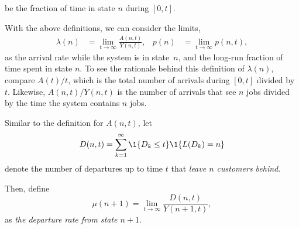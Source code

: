 be the fraction of time in state $n$ during $[0,t]$. 





With the above definitions, we can consider the limits,
\begin{align}\label{eq:p(n)}
 \lambda(n) &= \lim_{t\to\infty} \frac{A(n,t)}{Y(n,t)}, &p(n) &=\lim_{t\to\infty} p(n,t),
\end{align}
as the arrival rate while the system is in state~$n$, and the long-run fraction of time spent in state $n$.
To see the rationale behind this definition of $\lambda(n)$, compare $A(t)/t$, which is the total number of arrivals during $[0,t]$ divided by~$t$.
Likewise, $A(n,t)/Y(n,t)$ is the number of arrivals that see $n$ jobs divided by the time the system contains $n$ jobs.



Similar to the definition for $A(n,t)$, let 
\begin{equation}\label{eq:102}
 D(n,t) = \sum_{k=1}^\infty \1{D_k \leq t} \1{\L(D_k) = n}
 \end{equation}
 denote the number of departures up to time $t$ that\emph{ leave $n$
 customers behind}.
\begin{marginfigure}%
\end{marginfigure}
Then, define
\begin{equation*}
 \mu(n+1) = \lim_{t\to\infty} \frac{D(n,t)}{Y(n+1,t)},
\end{equation*}
as \emph{ the departure rate from state $n+1$}.

